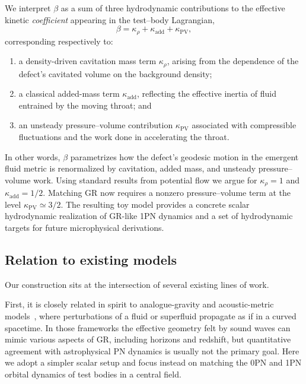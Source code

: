 \documentclass[11pt]{article}
\begin{document}
We interpret $\beta$ as a sum of three hydrodynamic contributions to the
effective kinetic \emph{coefficient} appearing in the test--body Lagrangian,
\begin{equation}
  \beta = \kappa_\rho + \kappa_{\mathrm{add}} + \kappa_{\mathrm{PV}},
\end{equation}
corresponding respectively to:
\begin{enumerate}
  \item a density-driven cavitation mass term $\kappa_\rho$, arising from the dependence of the defect's cavitated volume on the background density;
  \item a classical added-mass term $\kappa_{\mathrm{add}}$, reflecting the effective inertia of fluid entrained by the moving throat; and
  \item an unsteady pressure--volume contribution $\kappa_{\mathrm{PV}}$ associated with compressible fluctuations and the work done in accelerating the throat.
\end{enumerate}
In other words, $\beta$ parametrizes how the defect's geodesic motion in the emergent
fluid metric is renormalized by cavitation, added mass, and unsteady pressure--volume work.
Using standard results from potential flow we argue for $\kappa_\rho = 1$ and $\kappa_{\mathrm{add}} = 1/2$. Matching GR now requires a nonzero pressure--volume term at the level $\kappa_{\mathrm{PV}} \simeq 3/2$. The resulting toy model provides a concrete scalar hydrodynamic realization of GR-like 1PN dynamics and a set of hydrodynamic targets for future microphysical derivations.

\subsection{Relation to existing models}
\label{sec:intro_related}

Our construction sits at the intersection of several existing lines of work.

First, it is closely related in spirit to analogue-gravity and acoustic-metric models~\cite{Unruh:1980cg,Barcelo:2005fc}, where perturbations of a fluid or superfluid propagate as if in a curved spacetime. In those frameworks the effective geometry felt by sound waves can mimic various aspects of GR, including horizons and redshift, but quantitative agreement with astrophysical PN dynamics is usually not the primary goal. Here we adopt a simpler scalar setup and focus instead on matching the 0PN and 1PN orbital dynamics of test bodies in a central field.
\end{document}
